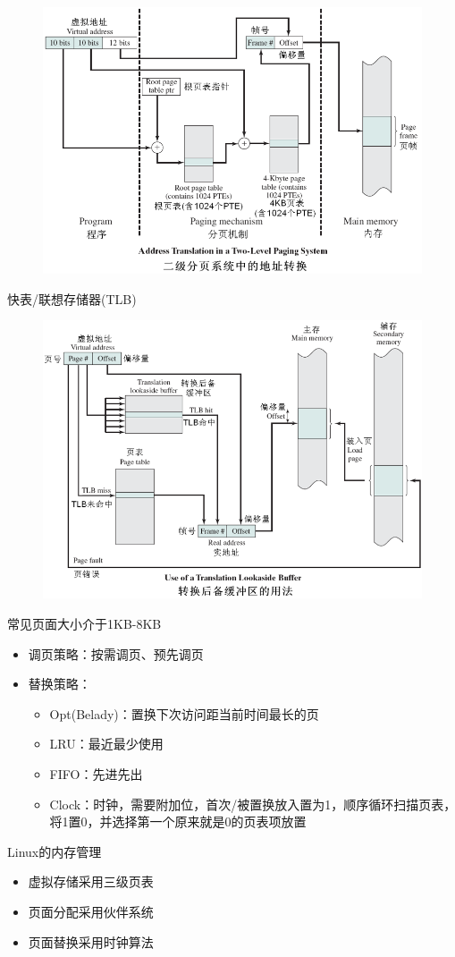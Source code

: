 \begin{figure}[H]
    \centering
    \includegraphics[width=0.8\linewidth]{fig/two-level_paging.png}
\end{figure}

快表/联想存储器(TLB)
\begin{figure}[H]
    \centering
    \includegraphics[width=0.8\linewidth]{fig/TLB.png}
\end{figure}

常见页面大小介于1KB-8KB

\begin{itemize}
    \item 调页策略：按需调页、预先调页
    \item 替换策略：
    \begin{itemize}
        \item Opt(Belady)：置换下次访问距当前时间最长的页
        \item LRU：最近最少使用
        \item FIFO：先进先出
        \item Clock：时钟，需要附加位，首次/被置换放入置为1，顺序循环扫描页表，将1置0，并选择第一个原来就是0的页表项放置
    \end{itemize}
\end{itemize}

Linux的内存管理
\begin{itemize}
    \item 虚拟存储采用三级页表
    \item 页面分配采用伙伴系统
    \item 页面替换采用时钟算法
\end{itemize}